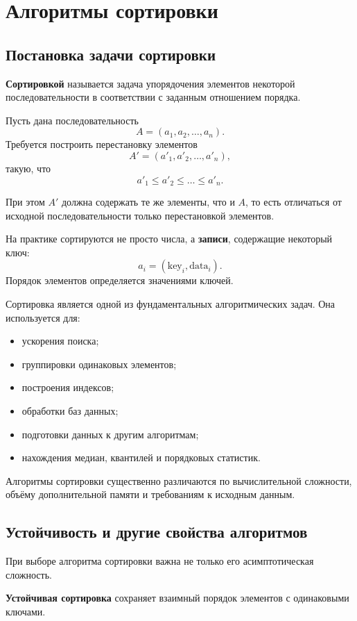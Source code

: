 \section{Алгоритмы сортировки}

\subsection{Постановка задачи сортировки}

\textbf{Сортировкой} называется задача упорядочения элементов некоторой
последовательности в соответствии с заданным отношением порядка.

Пусть дана последовательность
\[
A = (a_1,a_2,\ldots,a_n).
\]
Требуется построить перестановку элементов
\[
A' = (a'_1,a'_2,\ldots,a'_n),
\]
такую, что
\[
a'_1 \leq a'_2 \leq \ldots \leq a'_n.
\]

При этом $A'$ должна содержать те же элементы, что и $A$, то есть отличаться
от исходной последовательности только перестановкой элементов.

На практике сортируются не просто числа, а \textbf{записи}, содержащие
некоторый ключ:
\[
a_i = (\text{key}_i,\text{data}_i).
\]
Порядок элементов определяется значениями ключей.

Сортировка является одной из фундаментальных алгоритмических задач.
Она используется для:
\begin{itemize}
	\item ускорения поиска;
	\item группировки одинаковых элементов;
	\item построения индексов;
	\item обработки баз данных;
	\item подготовки данных к другим алгоритмам;
	\item нахождения медиан, квантилей и порядковых статистик.
\end{itemize}

Алгоритмы сортировки существенно различаются по вычислительной сложности,
объёму дополнительной памяти и требованиям к исходным данным.


\subsection{Устойчивость и другие свойства алгоритмов}

При выборе алгоритма сортировки важна не только его асимптотическая
сложность.

\textbf{Устойчивая сортировка} сохраняет взаимный порядок элементов
с одинаковыми ключами.

